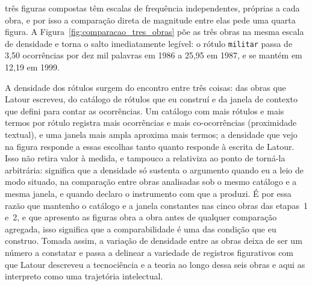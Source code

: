 três figuras compostas têm escalas de frequência independentes, próprias a cada obra, e por isso a comparação direta de magnitude entre elas pede uma quarta figura. A Figura~\ref{fig:comparacao_tres_obras} põe as três obras na mesma escala de densidade e torna o salto imediatamente legível: o rótulo \texttt{militar} passa de 3,50 ocorrências por dez mil palavras em 1986 a 25,95 em 1987, e se mantém em 12,19 em 1999.

A densidade dos rótulos surgem do encontro entre três coisas: das obras que Latour escreveu, do catálogo de rótulos que eu construí e da janela de contexto que defini para contar as ocorrências. Um catálogo com mais rótulos e mais termos por rótulo registra mais ocorrências e mais co-ocorrências (proximidade textual), e uma janela mais ampla aproxima mais termos; a densidade que vejo na figura responde a essas escolhas tanto quanto responde à escrita de Latour. Isso não retira valor à medida, e tampouco a relativiza ao ponto de torná-la arbitrária: significa que a densidade só sustenta o argumento quando eu a leio de modo situado, na comparação entre obras analisadas sob o mesmo catálogo e a mesma janela, e quando declaro o instrumento com que a produzi. É por essa razão que mantenho o catálogo e a janela constantes nas cinco obras das etapas~1 e~2, e que apresento as figuras obra a obra antes de qualquer comparação agregada, isso significa que a comparabilidade é uma das condição que eu construo. Tomada assim, a variação de densidade entre as obras deixa de ser um número a constatar e passa a delinear a variedade de registros figurativos com que Latour descreveu a tecnociência e a teoria ao longo dessa seis obras e aqui as interpreto como uma trajetória intelectual. 

